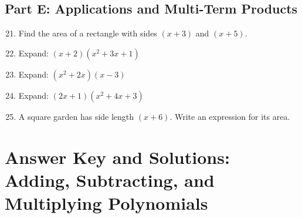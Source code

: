 \documentclass[14pt]{extarticle}
\begin{document}
\subsection*{Part E: Applications and Multi-Term Products}
\begin{enumerate}
  \setcounter{enumi}{20}
  \item Find the area of a rectangle with sides \((x + 3)\) and \((x + 5)\).
  \item Expand: \((x + 2)(x^2 + 3x + 1)\)
  \item Expand: \((x^2 + 2x)(x - 3)\)
  \item Expand: \((2x + 1)(x^2 + 4x + 3)\)
  \item A square garden has side length \((x + 6)\). Write an expression for its area.
\end{enumerate}

\newpage


\section*{Answer Key and Solutions: Adding, Subtracting, and Multiplying Polynomials}
\end{document}
